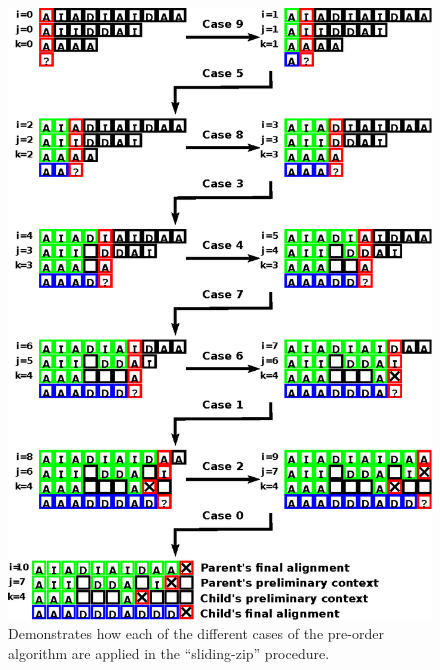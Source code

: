 \documentclass{bmcart}
\begin{document}
\begin{backmatter}
	\begin{figure}[h!]
		\caption{
			Demonstrates how each of the different cases of the pre-order algorithm are applied in the ``sliding-zip'' procedure.}
		\label{Fig:Examplepre-order}
		\vspace{2ex}
		\includegraphics{example-preorder.eps}
	\end{figure}
	
%
%	
%
	

\end{backmatter}
\end{document}
